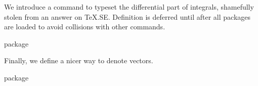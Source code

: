 \documentclass[commonsets,load]{skdoc}
\begin{document}
  We introduce a command to typeset the differential part
  of integrals, shamefully stolen from an answer on \TeX.SE.
  Definition is deferred until after all packages are loaded
  to avoid collisions with other  commands.
\begin{MacroCode}{package}
\end{MacroCode}
 
  Finally, we define a nicer way to denote vectors.
  \begin{macro}{\vec}
\begin{MacroCode}{package}
\let\vec\vectorsym
\end{MacroCode}
  \end{macro}

    \PrintChanges
    \PrintIndex
\end{document}
